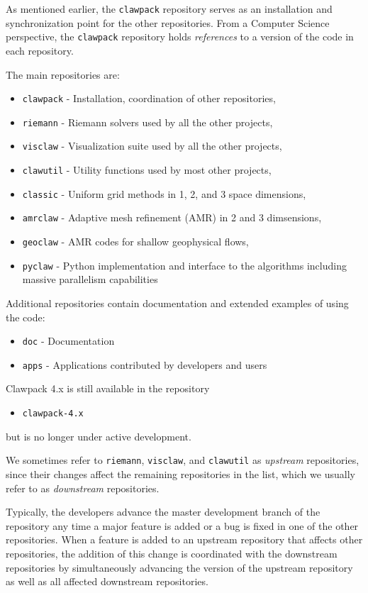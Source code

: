 As mentioned earlier, the \texttt{clawpack} repository serves as an
installation and synchronization point for the other repositories.
From a Computer Science perspective, the \texttt{clawpack} repository
holds \textit{references} to a version of the code in each
repository.  

The main \clawpack repositories are:
\begin{itemize}
    \item \texttt{clawpack} - Installation, coordination of other repositories,
    \item \texttt{riemann} - Riemann solvers used by all the other projects,
    \item \texttt{visclaw} - Visualization suite used by all the other projects,
    \item \texttt{clawutil} - Utility functions used by most other projects,
    \item \texttt{classic} - Uniform grid methods in 1, 2, and 3 space dimensions,
    \item \texttt{amrclaw} - Adaptive mesh refinement (AMR) in 2 and 3 dimsensions,
    \item \texttt{geoclaw} - AMR codes for shallow geophysical flows,
    \item \texttt{pyclaw} - Python implementation and interface to the \clawpack algorithms including massive parallelism capabilities
\end{itemize}

Additional repositories contain documentation and extended examples of
using the code: 
\begin{itemize}
    \item \texttt{doc} - Documentation
    \item \texttt{apps} - Applications contributed by developers and users
\end{itemize}
Clawpack 4.x is still available in the repository
\begin{itemize}
    \item \texttt{clawpack-4.x}
\end{itemize}
but is no longer under active development.

We sometimes refer to \texttt{riemann}, \texttt{visclaw}, and
\texttt{clawutil} as
\textit{upstream} repositories, since their changes affect the
remaining repositories in the list, which we usually refer to as
\textit{downstream} repositories.

Typically, the \clawpack developers advance the master development
branch of the repository any time a major feature is added or a bug is
fixed in one of the other repositories.  When a feature is added to an
upstream repository that affects other repositories, the addition of
this change is coordinated with the downstream repositories by
simultaneously advancing the version of the upstream repository as
well as all affected downstream repositories.  


